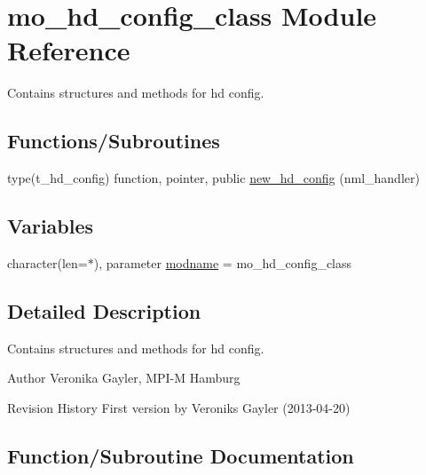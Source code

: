 \hypertarget{namespacemo__hd__config__class}{}\section{mo\+\_\+hd\+\_\+config\+\_\+class Module Reference}
\label{namespacemo__hd__config__class}


Contains structures and methods for hd config.  


\subsection*{Functions/\+Subroutines}
\begin{DoxyCompactItemize}
\item 
type(t\+\_\+hd\+\_\+config) function, pointer, public \hyperlink{namespacemo__hd__config__class_acc4bf17e3db786bdbe4c6634717b53f7}{new\+\_\+hd\+\_\+config} (nml\+\_\+handler)
\end{DoxyCompactItemize}
\subsection*{Variables}
\begin{DoxyCompactItemize}
\item 
character(len=$\ast$), parameter \hyperlink{namespacemo__hd__config__class_a0541298ddcbe68dca19b1f7b1352d9e7}{modname} = \textquotesingle{}mo\+\_\+hd\+\_\+config\+\_\+class\textquotesingle{}
\end{DoxyCompactItemize}


\subsection{Detailed Description}
Contains structures and methods for hd config. 

\begin{DoxyAuthor}{Author}
Veronika Gayler, M\+P\+I-\/\+M Hamburg
\end{DoxyAuthor}
\begin{DoxyParagraph}{Revision History}
First version by Veroniks Gayler (2013-\/04-\/20) 
\end{DoxyParagraph}


\subsection{Function/\+Subroutine Documentation}
\hypertarget{namespacemo__hd__config__class_acc4bf17e3db786bdbe4c6634717b53f7}{}
